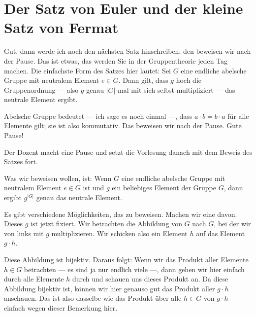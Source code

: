 \section{Der Satz von Euler und der kleine Satz von Fermat}

\begin{spoken-clean}[00:42:37 - 00:44:59]
Gut, dann werde ich noch den nächsten Satz hinschreiben; den beweisen wir nach der Pause. Das ist etwas, das werden Sie in der Gruppentheorie jeden Tag machen. Die einfachste Form des Satzes hier lautet: Sei $G$ eine endliche abelsche Gruppe mit neutralem Element $e \in G$. Dann gilt, dass $g$ hoch die Gruppenordnung --- also $g$ genau $|G|$-mal mit sich selbst multipliziert --- das neutrale Element ergibt.

Abelsche Gruppe bedeutet --- ich sage es noch einmal ---, dass $a \cdot b = b \cdot a$ für alle Elemente gilt; sie ist also kommutativ. Das beweisen wir nach der Pause. Gute Pause!
\end{spoken-clean}

\begin{lecture-break}[Pause]
Der Dozent macht eine Pause und setzt die Vorlesung danach mit dem Beweis des Satzes fort.
\end{lecture-break}

\begin{spoken-clean}[00:44:59 - 00:47:11]
Was wir beweisen wollen, ist: Wenn $G$ eine endliche abelsche Gruppe mit neutralem Element $e \in G$ ist und $g$ ein beliebiges Element der Gruppe $G$, dann ergibt $g^{|G|}$ genau das neutrale Element.

Es gibt verschiedene Möglichkeiten, das zu beweisen. Machen wir eine davon. Dieses $g$ ist jetzt fixiert. Wir betrachten die Abbildung von $G$ nach $G$, bei der wir von links mit $g$ multiplizieren. Wir schicken also ein Element $h$ auf das Element $g \cdot h$.

Diese Abbildung ist bijektiv. Daraus folgt: Wenn wir das Produkt aller Elemente $h \in G$ betrachten --- es sind ja nur endlich viele ---, dann gehen wir hier einfach durch alle Elemente $h$ durch und schauen uns dieses Produkt an. Da diese Abbildung bijektiv ist, können wir hier genauso gut das Produkt aller $g \cdot h$ anschauen. Das ist also dasselbe wie das Produkt über alle $h \in G$ von $g \cdot h$ --- einfach wegen dieser Bemerkung hier.
\end{spoken-clean}

